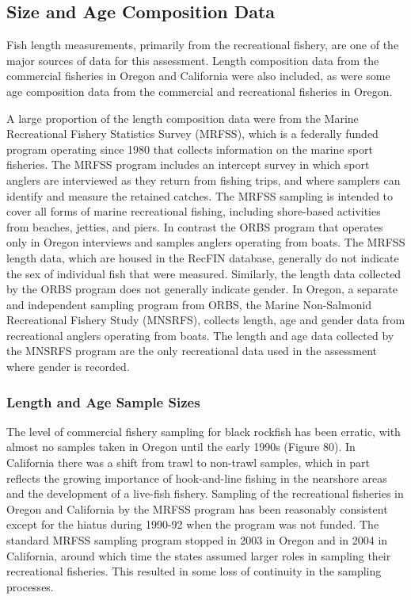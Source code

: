 \documentclass[11pt,
  english,
  letterpaper,
]{article}
\begin{document}
\hypertarget{size-and-age-composition-data}{%
\subsection{Size and Age Composition Data}\label{size-and-age-composition-data}}

Fish length measurements, primarily from the recreational fishery, are one of the major sources of data for this assessment. Length composition data from the commercial fisheries in Oregon and California were also included, as were some age composition data from the commercial and recreational fisheries in Oregon.

A large proportion of the length composition data were from the Marine Recreational Fishery Statistics Survey (MRFSS), which is a federally funded program operating since 1980 that collects information on the marine sport fisheries. The MRFSS program includes an intercept survey in which sport anglers are interviewed as they return from fishing trips, and where samplers can identify and measure the retained catches. The MRFSS sampling is intended to cover all forms of marine recreational fishing, including shore-based activities from beaches, jetties, and piers. In contrast the ORBS program that operates only in Oregon interviews and samples anglers operating from boats. The MRFSS length data, which are housed in the RecFIN database, generally do not indicate the sex of individual fish that were measured. Similarly, the length data collected by the ORBS program does not generally indicate gender. In Oregon, a separate and independent sampling program from ORBS, the Marine Non-Salmonid Recreational Fishery Study (MNSRFS), collects length, age and gender data from recreational anglers operating from boats. The length and age data collected by the MNSRFS program are the only recreational data used in the assessment where gender is recorded.

\hypertarget{length-and-age-sample-sizes}{%
\subsubsection{Length and Age Sample Sizes}\label{length-and-age-sample-sizes}}

The level of commercial fishery sampling for black rockfish has been erratic, with almost no samples taken in Oregon until the early 1990s (Figure 80). In California there was a shift from trawl to non-trawl samples, which in part reflects the growing importance of hook-and-line fishing in the nearshore areas and the development of a live-fish fishery. Sampling of the recreational fisheries in Oregon and California by the MRFSS program has been reasonably consistent except for the hiatus during 1990-92 when the program was not funded. The standard MRFSS sampling program stopped in 2003 in Oregon and in 2004 in California, around which time the states assumed larger roles in sampling their recreational fisheries. This resulted in some loss of continuity in the sampling processes.
\end{document}
